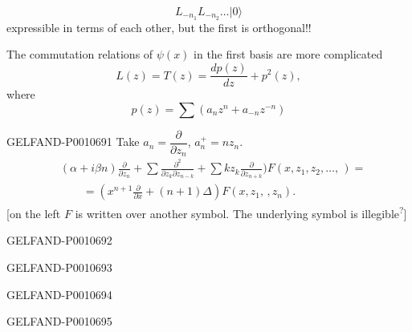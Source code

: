 \begin{equation*}
L_{-n_1}L_{-n_2}\ldots|0\rangle
\end{equation*}
expressible in terms of each other, but the first is orthogonal!!

The commutation relations of $\psi(x)$ in the first basis are more complicated
\begin{equation*}
L(z)=T(z)=\frac{dp(z)}{dz}+p^2(z),
\end{equation*}
where
\begin{equation*}
p(z)=\sum(a_nz^n+a_{-n}z^{-n})
\end{equation*}


\begin{GelfandAdjacentEvidence}{GELFAND-P001069}{1}
Take $a_n=\dfrac{\partial}{\partial z_n}$, $a_n^+=nz_n$.
\begin{equation*}
\begin{aligned}
&(\alpha+i\beta n)\frac{\partial}{\partial z_n}
+\sum\frac{\partial^2}{\partial z_k\partial z_{n-k}}
+\sum kz_k\frac{\partial}{\partial z_{n+k}}\biggr)
F(x,z_1,z_2,\ldots,\,) =\\
&\qquad=\left(x^{n+1}\frac{\partial}{\partial x}+(n+1)\Delta\right)F(x,z_1,\, ,z_n).
\end{aligned}
\end{equation*}
[on the left \(F\) is written over another symbol. The underlying symbol is illegible\textsuperscript{?}]
\end{GelfandAdjacentEvidence}
\begin{GelfandAdjacentEvidence}{GELFAND-P001069}{2}

\end{GelfandAdjacentEvidence}
\begin{GelfandAdjacentEvidence}{GELFAND-P001069}{3}

\end{GelfandAdjacentEvidence}
\begin{GelfandAdjacentEvidence}{GELFAND-P001069}{4}

\end{GelfandAdjacentEvidence}
\begin{GelfandAdjacentEvidence}{GELFAND-P001069}{5}

\end{GelfandAdjacentEvidence}



